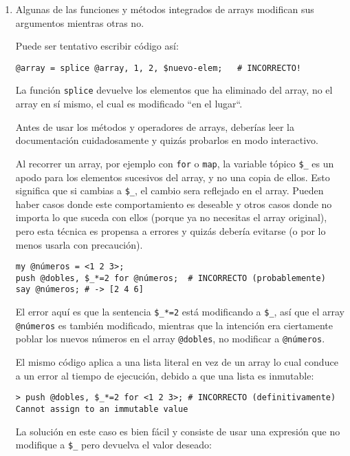 \begin{enumerate}

\item Algunas de las funciones y métodos integrados de arrays
modifican sus argumentos mientras otras no.

Puede ser tentativo escribir código así:

\begin{verbatim}
@array = splice @array, 1, 2, $nuevo-elem;   # INCORRECTO!
\end{verbatim}

La función {\tt splice} devuelve los elementos
que ha eliminado del array, no el array en sí mismo,
el cual es modificado ``en el lugar``.

Antes de usar los métodos y operadores de arrays,
deberías leer la documentación cuidadosamente y quizás
probarlos en modo interactivo.

Al recorrer un array, por ejemplo con {\tt for}
o {\tt map}, la variable tópico \verb|$_| es
un apodo para los elementos sucesivos del array,
y no una copia de ellos. Esto significa que si
cambias a \verb|$_|, el cambio sera reflejado en
el array. Pueden haber casos donde este comportamiento
es deseable y otros casos donde no importa lo que suceda
con ellos (porque ya no necesitas el array original),
pero esta técnica es propensa a errores y quizás debería
evitarse (o por lo menos usarla con precaución).

\begin{verbatim}
my @números = <1 2 3>;
push @dobles, $_*=2 for @números;  # INCORRECTO (probablemente)
say @números; # -> [2 4 6]
\end{verbatim}

El error aquí es que la sentencia \verb|$_*=2| está
modificando a \verb|$_|, así que el array \verb|@números|
es también modificado, mientras que la intención era 
ciertamente poblar los nuevos números en el array
\verb|@dobles|, no modificar a \verb|@números|.

El mismo código aplica a una lista literal en vez de 
un array lo cual conduce a un error al tiempo de 
ejecución, debido a que una lista es inmutable:

\begin{verbatim}
> push @dobles, $_*=2 for <1 2 3>; # INCORRECTO (definitivamente)
Cannot assign to an immutable value
\end{verbatim}

La solución en este caso es bien fácil y consiste
de usar una expresión que no modifique a \verb|$_|
pero devuelva el valor deseado:


\end{enumerate}
